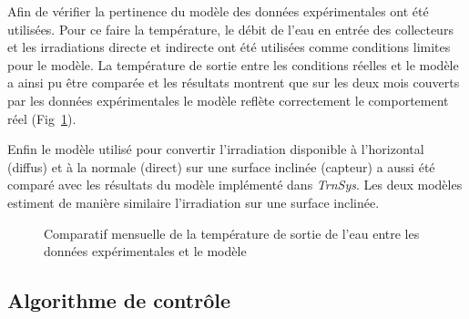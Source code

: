 Afin de vérifier la pertinence du modèle des données expérimentales ont été utilisées.
Pour ce faire la température, le débit de l’eau en entrée des collecteurs et les
irradiations directe et indirecte ont été utilisées comme conditions limites pour le
modèle. La température de sortie entre les conditions réelles et le modèle a ainsi
pu être comparée et les résultats montrent que sur les deux mois couverts par les données
expérimentales le modèle reflète correctement le comportement réel (Fig~\ref{fig:compare_exp_modele}).

Enfin le modèle utilisé pour convertir l’irradiation disponible à l’horizontal (diffus)
et à la normale (direct) sur une surface inclinée (capteur) a aussi été comparé
avec les résultats du modèle implémenté dans \emph{TrnSys}. Les deux
modèles estiment de manière similaire l’irradiation sur une surface inclinée.

\begin{figure}
    \begin{center}
    \end{center}
    \caption{Comparatif mensuelle de la température de sortie de l’eau entre
             les données expérimentales et le modèle
             \label{fig:compare_exp_modele}}
\end{figure}


\subsection{Algorithme de contrôle} %
\label{sub:algorithme_de_controle}

